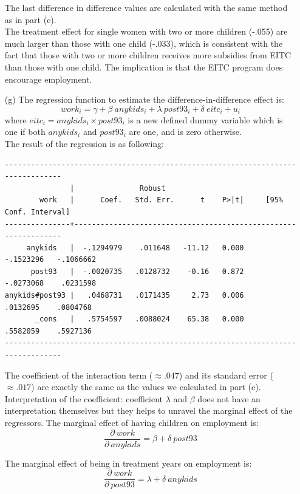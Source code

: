 \documentclass{article}
\begin{document}
\begin{enumerate}
The last difference in difference values are calculated with the same method as in part (e).\\

The treatment effect for single women with two or more children (-.055) are much larger than those  
with one child (-.033), which is consistent with the fact that those with two or more children 
receives more subsidies from EITC than those with one child. The implication is that the EITC 
program does encourage employment.  

\newpage

\item[(g)] The regression function to estimate the difference-in-difference effect is:
$$ work_i = \gamma + \beta\ anykids_i + \lambda\ post93_i + \delta\ eitc_i + u_i $$
where $eitc_i = anykids_i\times post93_i$ is a new defined dummy variable which is one  
if both $anykids_i$ and $post93_i$ are one, and is zero otherwise.\\

The result of the regression is as following:

\begin{verbatim}
--------------------------------------------------------------------------------
               |               Robust
        work   |      Coef.   Std. Err.      t    P>|t|     [95% Conf. Interval]
---------------+----------------------------------------------------------------
     anykids   |  -.1294979    .011648   -11.12   0.000    -.1523296   -.1066662
      post93   |  -.0020735   .0128732    -0.16   0.872    -.0273068    .0231598
anykids#post93 |   .0468731   .0171435     2.73   0.006     .0132695    .0804768
       _cons   |   .5754597   .0088024    65.38   0.000     .5582059    .5927136
--------------------------------------------------------------------------------
\end{verbatim}

The coefficient of the interaction term ($\approx .047$) and its standard error ($\approx .017$) 
are exactly the same as the values we calculated in part (e). \\

Interpretation of the coefficient: coefficient $\lambda$ and $\beta$ does not have an interpretation
themselves but they helps to unravel the marginal effect of the regressors. 
The marginal effect of having children on employment is:
$$ \frac{\partial\ work}{\partial\ anykids} = \beta + \delta\ post93 $$

The marginal effect of being in treatment years on employment is:
$$ \frac{\partial\ work}{\partial\ post93} = \lambda + \delta\ anykids $$


\end{enumerate}
\end{document}
